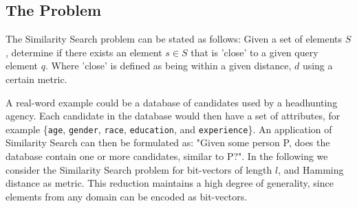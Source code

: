 \documentclass[a4paper,11pt]{article}
\begin{document}
\subsection{The Problem}
The Similarity Search problem can be stated as follows: Given a set of elements $S$, determine if there exists an element $s \in S$ that is 'close' to a given query element $q$. Where 'close' is defined as being within a given distance, $d$ using a certain metric.

A real-word example could be a database of candidates used by a headhunting agency. Each candidate in the database would then have a set of attributes, for example \{\texttt{age}, \texttt{gender}, \texttt{race}, \texttt{education}, and \texttt{experience}\}.
An application of Similarity Search can then be formulated as: "Given some person P, does the database contain one or more candidates, similar to P?".
In the following we consider the Similarity Search problem for bit-vectors of length $l$, and Hamming distance as metric. This reduction maintains a high degree of generality, since elements from any domain can be encoded as bit-vectors.
\end{document}
